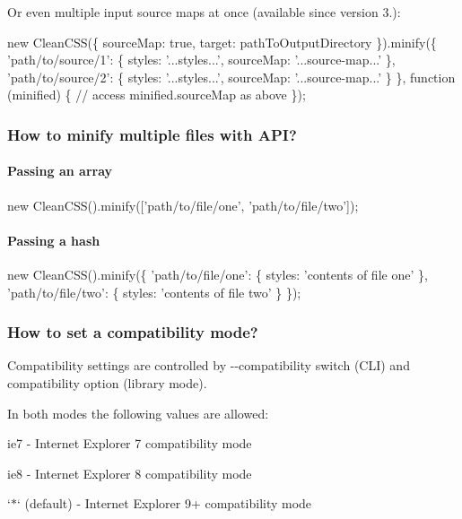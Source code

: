 Or even multiple input source maps at once (available since version 3.)\+:


\begin{DoxyCode}
new CleanCSS(\{ sourceMap: true, target: pathToOutputDirectory \}).minify(\{
  'path/to/source/1': \{
    styles: '...styles...',
    sourceMap: '...source-map...'
  \},
  'path/to/source/2': \{
    styles: '...styles...',
    sourceMap: '...source-map...'
  \}
\}, function (minified) \{
  // access minified.sourceMap as above
\});
\end{DoxyCode}


\subsubsection*{How to minify multiple files with A\+PI?}

\paragraph*{Passing an array}


\begin{DoxyCode}
new CleanCSS().minify(['path/to/file/one', 'path/to/file/two']);
\end{DoxyCode}


\paragraph*{Passing a hash}


\begin{DoxyCode}
new CleanCSS().minify(\{
  'path/to/file/one': \{
    styles: 'contents of file one'
  \},
  'path/to/file/two': \{
    styles: 'contents of file two'
  \}
\});
\end{DoxyCode}


\subsubsection*{How to set a compatibility mode?}

Compatibility settings are controlled by {\ttfamily -\/-\/compatibility} switch (C\+LI) and {\ttfamily compatibility} option (library mode).

In both modes the following values are allowed\+:


\begin{DoxyItemize}
\item {\ttfamily \textquotesingle{}ie7\textquotesingle{}} -\/ Internet Explorer 7 compatibility mode
\item {\ttfamily \textquotesingle{}ie8\textquotesingle{}} -\/ Internet Explorer 8 compatibility mode
\item `\textquotesingle{}\textquotesingle{}$\ast$\textquotesingle{}` (default) -\/ Internet Explorer 9+ compatibility mode
\end{DoxyItemize}

